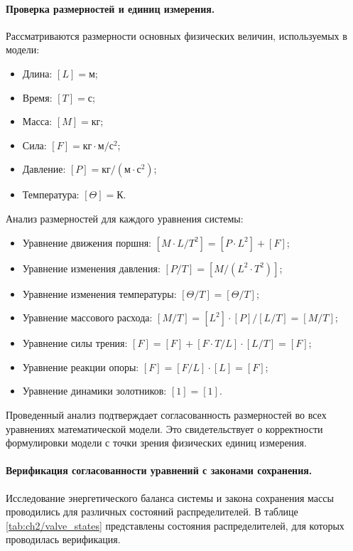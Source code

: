 \paragraph{Проверка размерностей и единиц измерения.}
Рассматриваются размерности основных физических величин, используемых в модели:

\begin{itemize}
    \item Длина: $ [L] = \text{м}$;
    \item Время: $ [T] = \text{с}$;
    \item Масса: $ [M] = \text{кг}$;
    \item Сила: $ [F] = \text{кг}\cdot\text{м}/\text{с}^2$;
    \item Давление: $ [P] = \text{кг}/(\text{м}\cdot\text{с}^2)$;
    \item Температура: $ [\Theta] = \text{К}$.
\end{itemize}

Анализ размерностей для каждого уравнения системы:
\begin{itemize}
    \item Уравнение движения поршня: $ [M\cdot L/T^2] = [P\cdot L^2] + [F]$;
    \item Уравнение изменения давления: $ [P/T] = [M/(L^2\cdot T^2)] $;
    \item Уравнение изменения температуры: $ [\Theta/T] = [\Theta/T]$;
    \item Уравнение массового расхода: $  [M/T] = [L^2] \cdot [P] / [L/T] = [M/T] $;
    \item Уравнение силы трения: $  [F] = [F] + [F\cdot T/L] \cdot [L/T] = [F] $;
    \item Уравнение реакции опоры: $  [F] = [F/L] \cdot [L] = [F] $;
    \item Уравнение динамики золотников: $  [1] = [1]$.
\end{itemize}


Проведенный анализ подтверждает согласованность размерностей во всех уравнениях математической модели.
Это свидетельствует о корректности формулировки модели с точки зрения физических единиц измерения.

\paragraph{Верификация согласованности уравнений с законами сохранения.}
Исследование энергетического баланса системы и закона сохранения массы проводились
для различных состояний распределителей. В таблице \ref{tab:ch2/valve_states} представлены состояния распределителей,
для которых проводилась верификация.

